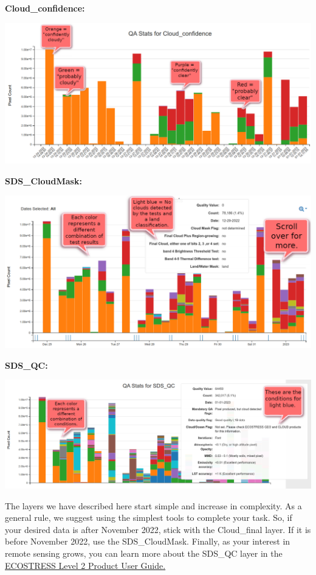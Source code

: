 \documentclass[oneside,a4paper,11pt,explicit]{book}
\begin{document}
	\textbf{Cloud\_confidence:}
	\centerline{\includegraphics[width=.85\textwidth]{Cloud_confidence.png}}
	
	\textbf{SDS\_CloudMask:}
	\centerline{\includegraphics[width=.85\textwidth]{SDS_CloudMask_Layer.png}}
	
	\clearpage
	
	\textbf{SDS\_QC:}
	\centerline{\includegraphics[width=\textwidth]{SDS_QC_Layer.png}}
	
	\vspace{.5em}
	
	The layers we have described here start simple and increase in complexity. As a general rule, we suggest using the simplest tools to complete your task. So, if your desired data is after November 2022, stick with the Cloud\_final layer. If it is before November 2022, use the SDS\_CloudMask. Finally, as your interest in remote sensing grows, you can learn more about the SDS\_QC layer in the \href{https://lpdaac.usgs.gov/documents/423/ECO2_User_Guide_V1.pdf}{ECOSTRESS Level 2 Product User Guide.}
\end{document}
